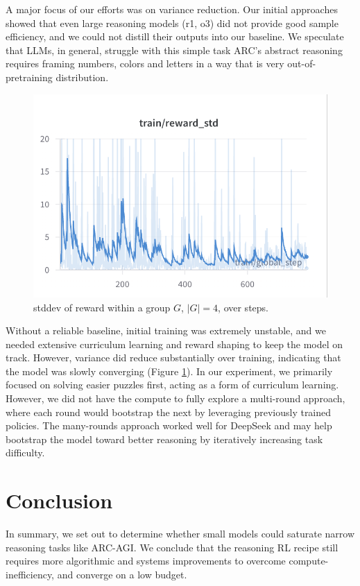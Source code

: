 \documentclass{article}
\begin{document}
A major focus of our efforts was on variance reduction. Our initial approaches showed that even large reasoning models (r1, o3) did not provide good sample efficiency, and we could not distill their outputs into our baseline. We speculate that LLMs, in general, struggle with this simple task ARC's abstract reasoning requires framing numbers, colors and letters in a way that is very out-of-pretraining distribution.
\begin{figure}[t]
  \centering
  \includegraphics[width=0.95\columnwidth]{bin/rvar.png}
  \caption{stddev of reward within a group $G$, $|G|=4$, over steps.}
  \label{fig:variance}
\end{figure}

Without a reliable baseline, initial training was extremely unstable, and we needed extensive curriculum learning and reward shaping to keep the model on track. However, variance did reduce substantially over training, indicating that the model was slowly converging (Figure \ref{fig:variance}). In our experiment, we primarily focused on solving easier puzzles first, acting as a form of curriculum learning. However, we did not have the compute to fully explore a multi-round approach, where each round would bootstrap the next by leveraging previously trained policies. The many-rounds approach worked well for DeepSeek and may help bootstrap the model toward better reasoning by iteratively increasing task difficulty.

\section{Conclusion}

In summary, we set out to determine whether small models could saturate narrow reasoning tasks like ARC-AGI. We conclude that the reasoning RL recipe still requires more algorithmic and systems improvements to overcome compute-inefficiency, and converge on a low budget.
\end{document}
